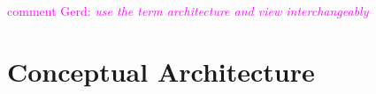 \documentclass{llncs} %
\newcommand{\ggr}[1]{\textcolor{magenta}{comment Gerd: \textit{#1}}}
\begin{document}
%	
%					 


	
	
	
	
	

\ggr{use the term architecture and view interchangeably}



\section{Conceptual Architecture}
\end{document}
